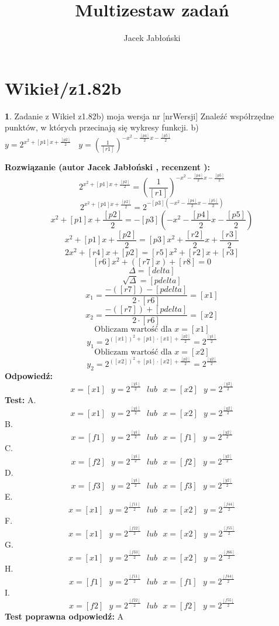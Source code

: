 \documentclass[12pt, a4paper]{article}
\title{Multizestaw zadań}
\author{Jacek Jabłoński}
\date{}
\theoremstyle{definition} %
\newtheorem{zad}{}
\newcommand{\kategoria}[1]{\section{#1}} %
\newcommand{\zadStart}[1]{\begin{zad}#1\newline} %
\newcommand{\zadStop}{\end{zad}}   %
\newcommand{\rozwStart}[2]{\noindent \textbf{Rozwiązanie (autor #1 , recenzent #2): }\newline} %
\newcommand{\rozwStop}{\newline}                                            %
\newcommand{\odpStart}{\noindent \textbf{Odpowiedź:}\newline}    %
\newcommand{\odpStop}{\newline}                                             %
\newcommand{\testStart}{\noindent \textbf{Test:}\newline} %
\newcommand{\testStop}{\newline} %
\newcommand{\kluczStart}{\noindent \textbf{Test poprawna odpowiedź:}\newline} %
\newcommand{\kluczStop}{\newline} %
\begin{document}
\maketitle


\kategoria{Wikieł/z1.82b}
\zadStart{Zadanie z Wikieł z1.82b) moja wersja nr [nrWersji]}
Znaleźć współrzędne punktów, w których przecinają się wykresy funkcji.
b) $y=2^{x^2+[p1]x+\frac{[p2]}{2}} \ \ \ \ y=(\frac{1}{[r1]})^{-x^2 - \frac{[p4]}{2}x - \frac{[p5]}{2}}$
\zadStop
\rozwStart{Jacek Jabłoński}{}
$$2^{x^2+[p1]x+\frac{[p2]}{2}} = (\frac{1}{[r1]})^{-x^2 - \frac{[p4]}{2}x - \frac{[p5]}{2}}$$
$$2^{x^2+[p1]x+\frac{[p2]}{2}} =2^{-[p3](-x^2 - \frac{[p4]}{2}x - \frac{[p5]}{2})}$$
$$x^2+[p1]x+\frac{[p2]}{2} = -[p3](-x^2 - \frac{[p4]}{2}x - \frac{[p5]}{2})$$
$$x^2+[p1]x+\frac{[p2]}{2} = [p3]x^2 + \frac{[r2]}{2}x + \frac{[r3]}{2} $$
$$2x^2 + [r4]x + [p2] = [r5]x^2 + [r2]x + [r3] $$
$$[r6]x^2 + ([r7]x) + [r8] = 0 $$
$$\Delta = [delta]$$
$$\sqrt{\Delta} = [pdelta]$$
$$x_1 = \frac{-([r7]) - [pdelta]}{2 \cdot [r6]} = [x1]$$
$$x_2 = \frac{-([r7]) + [pdelta]}{2 \cdot [r6]} = [x2]$$
$$\textrm{Obliczam wartość dla } x = [x1]$$
$$y_1=2^{([x1])^2 +[p1] \cdot [x1] + \frac{[p2]}{2}} = 2^{\frac{[y1]}{2}} $$
$$\textrm{Obliczam wartość dla } x = [x2]$$
$$y_2=2^{([x2])^2 +[p1] \cdot [x2] + \frac{[p2]}{2}} = 2^{\frac{[y2]}{2}} $$
\rozwStop
\odpStart
$$ x=[x1] \ \ \ y=2^{\frac{[y1]}{2}} \ \ \ lub \ \ \ x=[x2] \ \ \ y=2^{\frac{[y2]}{2}} $$
\odpStop
\testStart
A. $$ x=[x1] \ \ \ y=2^{\frac{[y1]}{2}} \ \ \ lub \ \ \ x=[x2] \ \ \ y=2^{\frac{[y2]}{2}} $$
B. $$ x=[f1] \ \ \ y=2^{\frac{[y1]}{2}} \ \ \ lub \ \ \ x=[f1] \ \ \ y=2^{\frac{[y2]}{2}} $$
C. $$ x=[f2] \ \ \ y=2^{\frac{[y1]}{2}} \ \ \ lub \ \ \ x=[f2] \ \ \ y=2^{\frac{[y2]}{2}} $$
D. $$ x=[f3] \ \ \ y=2^{\frac{[y1]}{2}} \ \ \ lub \ \ \ x=[f3] \ \ \ y=2^{\frac{[y2]}{2}} $$
E. $$ x=[x1] \ \ \ y=2^{\frac{[f11]}{2}} \ \ \ lub \ \ \ x=[x2] \ \ \ y=2^{\frac{[f44]}{2}} $$
F. $$ x=[x1] \ \ \ y=2^{\frac{[f22]}{2}} \ \ \ lub \ \ \ x=[x2] \ \ \ y=2^{\frac{[f55]}{2}} $$
G. $$ x=[x1] \ \ \ y=2^{\frac{[f33]}{2}} \ \ \ lub \ \ \ x=[x2] \ \ \ y=2^{\frac{[f66]}{2}} $$
H. $$ x=[f1] \ \ \ y=2^{\frac{[f11]}{2}} \ \ \ lub \ \ \ x=[f1] \ \ \ y=2^{\frac{[f44]}{2}} $$
I. $$ x=[f2] \ \ \ y=2^{\frac{[f22]}{2}} \ \ \ lub \ \ \ x=[f2] \ \ \ y=2^{\frac{[f55]}{2}} $$
\testStop
\kluczStart
A
\kluczStop
\end{document}
